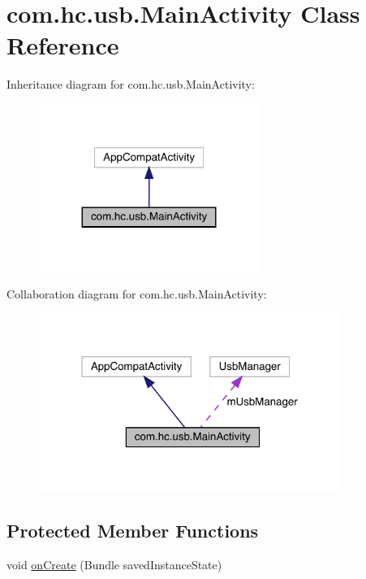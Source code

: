 \hypertarget{classcom_1_1hc_1_1usb_1_1_main_activity}{}\section{com.\+hc.\+usb.\+Main\+Activity Class Reference}
\label{classcom_1_1hc_1_1usb_1_1_main_activity}


Inheritance diagram for com.\+hc.\+usb.\+Main\+Activity\+:
\nopagebreak
\begin{figure}[H]
\begin{center}
\leavevmode
\includegraphics[width=203pt]{classcom_1_1hc_1_1usb_1_1_main_activity__inherit__graph}
\end{center}
\end{figure}


Collaboration diagram for com.\+hc.\+usb.\+Main\+Activity\+:
\nopagebreak
\begin{figure}[H]
\begin{center}
\leavevmode
\includegraphics[width=280pt]{classcom_1_1hc_1_1usb_1_1_main_activity__coll__graph}
\end{center}
\end{figure}
\subsection*{Protected Member Functions}
\begin{DoxyCompactItemize}
\item 
void \mbox{\hyperlink{classcom_1_1hc_1_1usb_1_1_main_activity_acca2ed5d06d58ec04eb8380f568fa224}{on\+Create}} (Bundle saved\+Instance\+State)
\end{DoxyCompactItemize}
